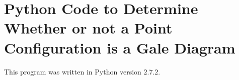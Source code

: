 
\chapter{Python Code to Determine Whether or not a Point Configuration is a Gale Diagram}\label{Appendix:Program}
This program was written in Python version \(2.7.2\).
\lstset{language=Python, breaklines=true}

